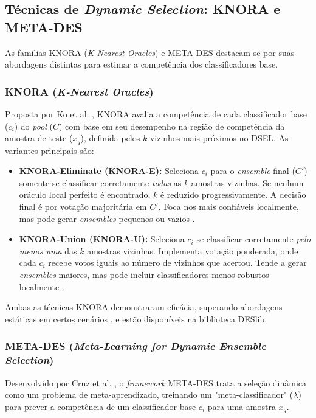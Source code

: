 \documentclass[12pt]{article}
\begin{document}
\subsection{Técnicas de \textit{Dynamic Selection}: KNORA e META-DES} 
As famílias KNORA (\textit{K-Nearest Oracles}) e META-DES destacam-se por suas abordagens distintas para estimar a competência dos classificadores base.

\subsubsection{KNORA (\textit{K-Nearest Oracles})}
Proposta por Ko et al. \cite{KO20081718}, KNORA avalia a competência de cada classificador base ($c_i$) do \textit{pool} ($C$) com base em seu desempenho na região de competência da amostra de teste ($x_q$), definida pelos $k$ vizinhos mais próximos no DSEL. As variantes principais são:

\begin{itemize}
    \item \textbf{KNORA-Eliminate (KNORA-E):} Seleciona $c_i$ para o \textit{ensemble} final ($C'$) somente se classificar corretamente \textit{todas} as $k$ amostras vizinhas. Se nenhum oráculo local perfeito é encontrado, $k$ é reduzido progressivamente. A decisão final é por votação majoritária em $C'$. Foca nos mais confiáveis localmente, mas pode gerar \textit{ensembles} pequenos ou vazios \cite{KO20081718}.

    \item \textbf{KNORA-Union (KNORA-U):} Seleciona $c_i$ se classificar corretamente \textit{pelo menos uma} das $k$ amostras vizinhas. Implementa votação ponderada, onde cada $c_i$ recebe votos iguais ao número de vizinhos que acertou. Tende a gerar \textit{ensembles} maiores, mas pode incluir classificadores menos robustos localmente \cite{KO20081718}.
\end{itemize}

Ambas as técnicas KNORA demonstraram eficácia, superando abordagens estáticas em certos cenários \cite{KO20081718}, e estão disponíveis na biblioteca DESlib.

\subsubsection{META-DES (\textit{Meta-Learning for Dynamic Ensemble Selection})} 
Desenvolvido por Cruz et al. \cite{Cruz_2015}, o \textit{framework} META-DES trata a seleção dinâmica como um problema de meta-aprendizado, treinando um "meta-classificador" ($\lambda$) para prever a competência de um classificador base $c_i$ para uma amostra $x_q$.
\end{document}
